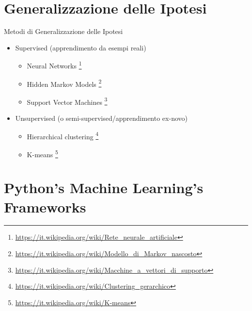 \documentclass[10pt]{beamer}
\begin{document}
	\section{Generalizzazione delle Ipotesi}
		
	\begin{frame}{Metodi di Generalizzazione delle Ipotesi}

		\begin{itemize}
			
			\item Supervised (apprendimento da esempi reali)
				
				\begin{itemize}

					\item Neural Networks \footnote{\tiny{\url{https://it.wikipedia.org/wiki/Rete_neurale_artificiale}}}

					\item Hidden Markov Models \footnote{\tiny{\url{https://it.wikipedia.org/wiki/Modello_di_Markov_nascosto}}}

					\item Support Vector Machines \footnote{\tiny{\url{https://it.wikipedia.org/wiki/Macchine_a_vettori_di_supporto}}}

				\end{itemize}

			\item Unsupervised (o semi-supervised/apprendimento ex-novo)

				\begin{itemize}

					\item Hierarchical clustering \footnote{\tiny{\url{https://it.wikipedia.org/wiki/Clustering_gerarchico}}}
					
					\item K-means \footnote{\tiny{\url{https://it.wikipedia.org/wiki/K-means}}}

				\end{itemize}

		\end{itemize}
	
	\end{frame}

	\section{Python's Machine Learning's Frameworks}
\end{document}
